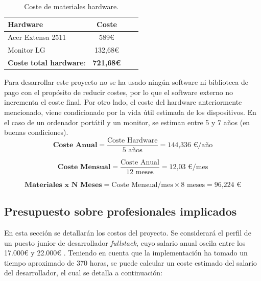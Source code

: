 \begin{table}[H]
    \begin{center}
    \begin{tabular}{| l | c | c | c |}
        \hline
        \textbf{Hardware} & \textbf{Coste} \\ \hline
        Acer Extensa 2511 & 589\euro \\
        Monitor LG & 132,68\euro \\ \hline
        \textbf{Coste total hardware}: & \textbf{721,68\euro} \\ \hline
    \end{tabular}
    \caption{Coste de materiales hardware.}
    \label{tab:costes-hardware}
    \end{center}
\end{table} 

Para desarrollar este proyecto no se ha usado ningún software ni biblioteca de pago con el propósito de reducir costes, por lo que el software externo no incrementa el coste final. Por otro lado, el coste del hardware anteriormente mencionado, viene condicionado por la vida útil estimada de los dispositivos. En el caso de un ordenador portátil y un monitor, se estiman entre 5 y 7 años (en buenas condiciones)\cite{tecfys2023}.
\begin{equation}
    \textbf{Coste Anual} = \frac {\text{Coste Hardware}}{\text{5 años}} = \text{144,336 €/año}
\end{equation}

\begin{equation}
    \textbf{Coste Mensual} = \frac {\text{Coste Anual}}{\text{12 meses}} = \text{12,03 €/mes}
\end{equation}

\begin{equation}
    \textbf{Materiales x N Meses} = \text{Coste Mensual/mes} \times \text{8 meses} = \text{96,224 €}
\end{equation}

\subsection{Presupuesto sobre profesionales implicados}
En esta sección se detallarán los costos del proyecto. Se considerará el perfil de un puesto junior de desarrollador \textit{fullstack}, cuyo salario anual oscila entre los 17.000€ y 22.000€ \cite{glassdoor2024}.
Teniendo en cuenta que la implementación ha tomado un tiempo aproximado de 370 horas, se puede calcular un coste estimado del salario del desarrollador, el cual se detalla a continuación:


